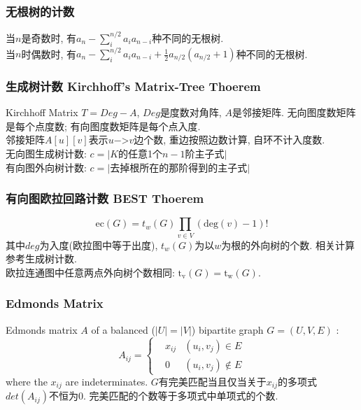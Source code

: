 \subsubsection{无根树的计数}\noindent
    当$n$是奇数时, 有$a_n-\sum_{i}^{n/2}a_ia_{n-i}$种不同的无根树. \\
    当$n$时偶数时, 有$a_n-\sum_{i}^{n/2}a_ia_{n-i}+\frac{1}{2}a_{n/2}(a_{n/2}+1)$种不同的无根树. 
\subsubsection{生成树计数 Kirchhoff's Matrix-Tree Thoerem}
    Kirchhoff Matrix $T=Deg-A$, $Deg$是度数对角阵, $A$是邻接矩阵. 无向图度数矩阵是每个点度数; 有向图度数矩阵是每个点入度.\\
    邻接矩阵$A[u][v]$表示$u$−>$v$边个数, 重边按照边数计算, 自环不计入度数.\\
    无向图生成树计数: $c=|K$的任意1个$n−1$阶主子式$|$\\
    有向图外向树计数: $c=|$去掉根所在的那阶得到的主子式$|$
\subsubsection{有向图欧拉回路计数 BEST Thoerem}
        \[ \mathrm{ec}(G) = t_w(G)\prod_{v \in{V}}(\mathrm{deg}(v) - 1)! \]
        其中$deg$为入度(欧拉图中等于出度), $t_w(G)$为以$w$为根的外向树的个数. 相关计算参考生成树计数.\\
        欧拉连通图中任意两点外向树个数相同: $\mathrm{t_v}(G) = \mathrm{t_w}(G)$.
    \subsubsection{Edmonds Matrix}
        Edmonds matrix $A$ of a balanced ($|U|=|V|$) bipartite graph $G=(U,V,E)$ : 
        \[A_{ij}=\left\{
            \begin{aligned}
                & x_{ij} & (u_i,v_j)\in E\\
                & 0 & (u_i,v_j)\notin E
            \end{aligned}
            \right.\]
        where the $x_{ij}$ are indeterminates. $G$有完美匹配当且仅当关于$x_{ij}$的多项式$det(A_{ij})$不恒为$0$.
        完美匹配的个数等于多项式中单项式的个数.
